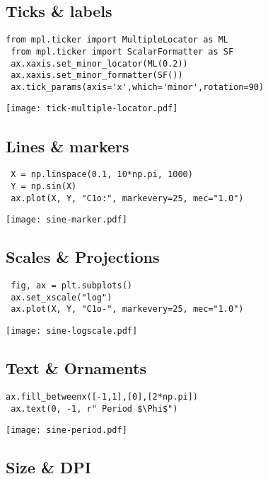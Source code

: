 \documentclass[10pt,landscape,a4paper]{article}
\begin{document}
\begin{multicols*}{3}
\subsection*{Ticks \& labels}

\begin{lstlisting}[basicstyle=\ttfamily\small]
 from mpl.ticker import MultipleLocator as ML
 from mpl.ticker import ScalarFormatter as SF
 ax.xaxis.set_minor_locator(ML(0.2))
 ax.xaxis.set_minor_formatter(SF())
 ax.tick_params(axis='x',which='minor',rotation=90)
\end{lstlisting}
\texttt{[image: tick-multiple-locator.pdf]}

\subsection*{Lines \& markers}

\begin{lstlisting}
 X = np.linspace(0.1, 10*np.pi, 1000)
 Y = np.sin(X)
 ax.plot(X, Y, "C1o:", markevery=25, mec="1.0")
\end{lstlisting}
\texttt{[image: sine-marker.pdf]}

\subsection*{Scales \& Projections}

\begin{lstlisting}
 fig, ax = plt.subplots()
 ax.set_xscale("log")
 ax.plot(X, Y, "C1o-", markevery=25, mec="1.0")
\end{lstlisting}
\texttt{[image: sine-logscale.pdf]}

\subsection*{Text \& Ornaments}
\begin{lstlisting}[]
 ax.fill_betweenx([-1,1],[0],[2*np.pi])
 ax.text(0, -1, r" Period $\Phi$")
\end{lstlisting}
\texttt{[image: sine-period.pdf]}


\subsection*{Size \& DPI}


\end{multicols*}
\end{document}
